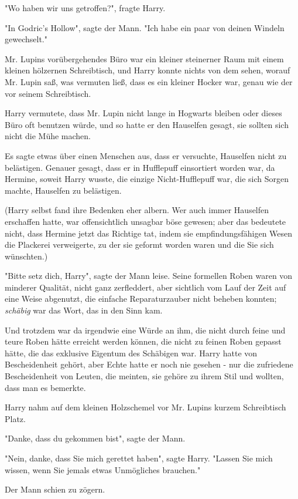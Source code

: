 {"Wo haben wir uns getroffen?", fragte Harry.

"In Godric's Hollow", sagte der Mann. "Ich habe ein paar von deinen Windeln gewechselt."

Mr. Lupins vorübergehendes Büro war ein kleiner steinerner Raum mit einem kleinen hölzernen Schreibtisch, und Harry konnte nichts von dem sehen, worauf Mr. Lupin saß, was vermuten ließ, dass es ein kleiner Hocker war, genau wie der vor seinem Schreibtisch.

Harry vermutete, dass Mr. Lupin nicht lange in Hogwarts bleiben oder dieses Büro oft benutzen würde, und so hatte er den Hauselfen gesagt, sie sollten sich nicht die Mühe machen.

Es sagte etwas über einen Menschen aus, dass er versuchte, Hauselfen nicht zu belästigen. Genauer gesagt, dass er in Hufflepuff einsortiert worden war, da Hermine, soweit Harry wusste, die einzige Nicht-Hufflepuff war, die sich Sorgen machte, Hauselfen zu belästigen.

(Harry selbst fand ihre Bedenken eher albern. Wer auch immer Hauselfen erschaffen hatte, war offensichtlich unsagbar böse gewesen; aber das bedeutete nicht, dass Hermine jetzt das Richtige tat, indem sie empfindungsfähigen Wesen die Plackerei verweigerte, zu der sie geformt worden waren und die Sie sich wünschten.)

"Bitte setz dich, Harry", sagte der Mann leise. Seine formellen Roben waren von minderer Qualität, nicht ganz zerfleddert, aber sichtlich vom Lauf der Zeit auf eine Weise abgenutzt, die einfache Reparaturzauber nicht beheben konnten; \emph{schäbig} war das Wort, das in den Sinn kam.

Und trotzdem war da irgendwie eine Würde an ihm, die nicht durch feine und teure Roben hätte erreicht werden können, die nicht zu feinen Roben gepasst hätte, die das exklusive Eigentum des Schäbigen war. Harry hatte von Bescheidenheit gehört, aber Echte hatte er noch nie gesehen - nur die zufriedene Bescheidenheit von Leuten, die meinten, sie gehöre zu ihrem Stil und wollten, dass man es bemerkte.

Harry nahm auf dem kleinen Holzschemel vor Mr. Lupins kurzem Schreibtisch Platz.

"Danke, dass du gekommen bist", sagte der Mann.

"Nein, danke, dass Sie mich gerettet haben", sagte Harry. "Lassen Sie mich wissen, wenn Sie jemals etwas Unmögliches brauchen."

Der Mann schien zu zögern.

}
